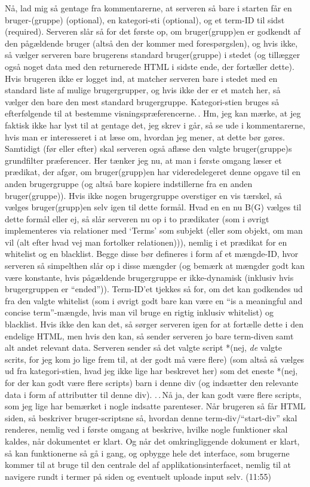 \documentclass{report}
\begin{document}
Nå, lad mig så gentage fra kommentarerne, at serveren så bare i starten får en bruger-(gruppe) (optional), en kategori-sti (optional), og et term-ID til sidst (required). Serveren slår så for det første op, om bruger(grupp)en er godkendt af den pågældende bruger (altså den der kommer med forespørgslen), og hvis ikke, så vælger serveren bare brugerens standard bruger(gruppe) i stedet (og tillægger også noget data med den returnerede HTML i sidste ende, der fortæller dette). Hvis brugeren ikke er logget ind, at matcher serveren bare i stedet med en standard liste af mulige brugergrupper, og hvis ikke der er et match her, så vælger den bare den mest standard brugergruppe. Kategori-stien bruges så efterfølgende til at bestemme visningspræferencerne.\,. Hm, jeg kan mærke, at jeg faktisk ikke har lyst til at gentage det, jeg skrev i går, så se ude i kommentarerne, hvis man er interesseret i at læse om, hvordan jeg mener, at dette bør gøres. Samtidigt (før eller efter) skal serveren også aflæse den valgte bruger(gruppe)s grundfilter præferencer. Her tænker jeg nu, at man i første omgang læser et prædikat, der afgør, om bruger(grupp)en har videredelegeret denne opgave til en anden brugergruppe (og altså bare kopiere indstillerne fra en anden bruger(gruppe)). Hvis ikke nogen brugergruppe overstiger en vis tærskel, så vælges bruger(grupp)en selv igen til dette formål. Hvad en en nu B(G) vælges til dette formål eller ej, så slår serveren nu op i to prædikater (som i øvrigt implementeres via relationer med `Terms' som subjekt (eller som objekt, om man vil (alt efter hvad vej man fortolker relationen))), nemlig i et prædikat for en whitelist og en blacklist. Begge disse bør defineres i form af et mængde-ID, hvor serveren så simpelthen slår op i disse mængder (og bemærk at mængder godt kan være konstante, hvis pågældende brugergruppe er ikke-dynamisk (inklusiv hvis brugergruppen er ``ended'')). Term-ID'et tjekkes så for, om det kan godkendes ud fra den valgte whitelist (som i øvrigt godt bare kan være en ``is a meaningful and concise term''-mængde, hvis man vil bruge en rigtig inklusiv whitelist) og blacklist. Hvis ikke den kan det, så sørger serveren igen for at fortælle dette i den endelige HTML, men hvis den kan, så sender serveren jo bare term-diven samt alt andet relevant data. Serveren sender så det valgte script *(nej, \emph{de} valgte scrits, for jeg kom jo lige frem til, at der godt må være flere) (som altså så vælges ud fra kategori-stien, hvad jeg ikke lige har beskrevet her) som det eneste *(nej, for der kan godt være flere scripts) barn i denne div (og indsætter den relevante data i form af attributter til denne div). .\,.\,Nå ja, der kan godt være flere scripts, som jeg lige har bemærket i nogle indsatte parenteser. Når brugeren så får HTML siden, så beskriver bruger-scriptsne så, hvordan denne term-div/``start-div'' skal renderes, nemlig ved i første omgang at beskrive, hvilke nogle funktioner skal kaldes, når dokumentet er klart. Og når det omkringliggende dokument er klart, så kan funktionerne så gå i gang, og opbygge hele det interface, som brugerne kommer til at bruge til den centrale del af applikationsinterfacet, nemlig til at navigere rundt i termer på siden og eventuelt uploade input selv. (11:55) %
\end{document}
